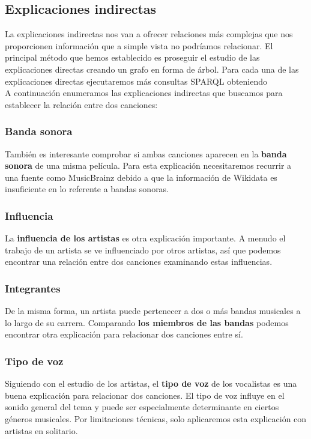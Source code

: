 \subsection{Explicaciones indirectas}

La explicaciones indirectas nos van a ofrecer relaciones más complejas que nos proporcionen información que a simple vista no podríamos relacionar.
El principal método que hemos establecido es proseguir el estudio de las explicaciones directas creando un grafo en forma de árbol.
Para cada una de las explicaciones directas ejecutaremos más consultas SPARQL obteniendo\\


A continuación enumeramos las explicaciones indirectas que buscamos para establecer la relación entre dos canciones:

\subsubsection*{Banda sonora}

También es interesante comprobar si ambas canciones aparecen en la \textbf{banda sonora} de una misma película. Para esta explicación necesitaremos recurrir a una fuente como MusicBrainz debido a que la información de Wikidata es insuficiente en lo referente a bandas sonoras.

\subsubsection*{Influencia}

La \textbf{influencia de los artistas} es otra explicación importante. A menudo el trabajo de un artista se ve influenciado por otros artistas, así que podemos encontrar una relación entre dos canciones examinando estas influencias.

\subsubsection*{Integrantes}

De la misma forma, un artista puede pertenecer a dos o más bandas musicales a lo largo de su carrera. Comparando \textbf{los miembros de las bandas} podemos encontrar otra explicación para relacionar dos canciones entre sí.

\subsubsection*{Tipo de voz}

Siguiendo con el estudio de los artistas, el \textbf{tipo de voz} de los vocalistas es una buena explicación para relacionar dos canciones. El tipo de voz influye en el sonido general del tema y puede ser especialmente determinante en ciertos géneros musicales. Por limitaciones técnicas, solo aplicaremos esta explicación con artistas en solitario.